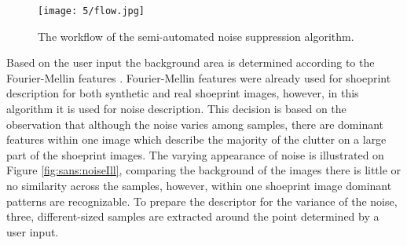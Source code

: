 \documentclass[draft,final]{vutinfth} %
\begin{document}
\begin{figure}[h]
  \centering
  \texttt{[image: 5/flow.jpg]}
  \caption{The workflow of the semi-automated noise suppression algorithm.}
  \label{fig:sans:workflow} %
\end{figure}

\par
Based on the user input the background area is determined according to the Fourier-Mellin features \cite{sheng1986circular}.
Fourier-Mellin features were already used for shoeprint description for both synthetic \cite{gueham2008automatic} and real \cite{wu2019crime} shoeprint images, however, in this algorithm it is used for noise description.
This decision is based on the observation that although the noise varies among samples, there are dominant features within one image which describe the majority of the clutter on a large part of the shoeprint images.
The varying appearance of noise is illustrated on Figure \ref{fig:sans:noiseIll}, comparing the background of the images there is little or no similarity across the samples, however, within one shoeprint image dominant patterns are recognizable.
To prepare the descriptor for the variance of the noise, three, different-sized samples are extracted around the point determined by a user input.
\end{document}
